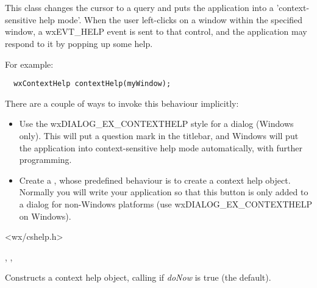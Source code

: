 \section{}\label{wxcontexthelp}

This class changes the cursor to a query and puts the application into a 'context-sensitive help mode'.
When the user left-clicks on a window within the specified window, a wxEVT\_HELP event is
sent to that control, and the application may respond to it by popping up some help.

For example:

\begin{verbatim}
  wxContextHelp contextHelp(myWindow);
\end{verbatim}

There are a couple of ways to invoke this behaviour implicitly:

\begin{itemize}
\item Use the wxDIALOG\_EX\_CONTEXTHELP style for a dialog (Windows only). This will put a question mark
in the titlebar, and Windows will put the application into context-sensitive help mode automatically,
with further programming.
\item Create a , whose predefined behaviour is to create a context help object.
Normally you will write your application so that this button is only added to a dialog for non-Windows platforms
(use wxDIALOG\_EX\_CONTEXTHELP on Windows).
\end{itemize}




<wx/cshelp.h>


, 
, 


\label{wxcontexthelpctor}


Constructs a context help object, calling  if\rtfsp
{\it doNow} is true (the default).

